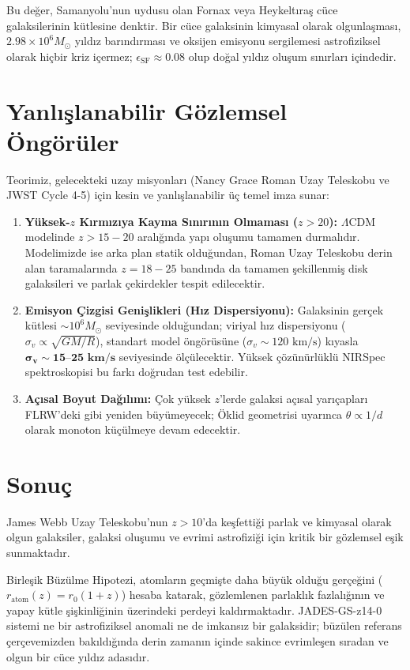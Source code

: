 \documentclass[11pt,a4paper]{article}
\begin{document}
Bu değer, Samanyolu'nun uydusu olan Fornax veya Heykeltıraş cüce galaksilerinin kütlesine denktir. Bir cüce galaksinin kimyasal olarak olgunlaşması, $2.98 \times 10^6 M_\odot$ yıldız barındırması ve oksijen emisyonu sergilemesi astrofiziksel olarak hiçbir kriz içermez; $\epsilon_{\mathrm{SF}} \approx 0.08$ olup doğal yıldız oluşum sınırları içindedir.

\section{Yanlışlanabilir Gözlemsel Öngörüler}
\label{sec:ongoruler}

Teorimiz, gelecekteki uzay misyonları (Nancy Grace Roman Uzay Teleskobu ve JWST Cycle 4-5) için kesin ve yanlışlanabilir üç temel imza sunar:

\begin{enumerate}
    \item \textbf{Yüksek-$z$ Kırmızıya Kayma Sınırının Olmaması ($z > 20$):} $\Lambda$CDM modelinde $z > 15-20$ aralığında yapı oluşumu tamamen durmalıdır. Modelimizde ise arka plan statik olduğundan, Roman Uzay Teleskobu derin alan taramalarında $z = 18 - 25$ bandında da tamamen şekillenmiş disk galaksileri ve parlak çekirdekler tespit edilecektir.
    \item \textbf{Emisyon Çizgisi Genişlikleri (Hız Dispersiyonu):} Galaksinin gerçek kütlesi $\sim 10^6 M_\odot$ seviyesinde olduğundan; viriyal hız dispersiyonu ($\sigma_v \propto \sqrt{GM/R}$), standart model öngörüsüne ($\sigma_v \sim 120\text{ km/s}$) kıyasla $\mathbf{\sigma_v \sim 15\text{--}25\text{ km/s}}$ seviyesinde ölçülecektir. Yüksek çözünürlüklü NIRSpec spektroskopisi bu farkı doğrudan test edebilir.
    \item \textbf{Açısal Boyut Dağılımı:} Çok yüksek $z$'lerde galaksi açısal yarıçapları FLRW'deki gibi yeniden büyümeyecek; Öklid geometrisi uyarınca $\theta \propto 1/d$ olarak monoton küçülmeye devam edecektir.
\end{enumerate}

\section{Sonuç}
\label{sec:sonuc}

James Webb Uzay Teleskobu'nun $z > 10$'da keşfettiği parlak ve kimyasal olarak olgun galaksiler, galaksi oluşumu ve evrimi astrofiziği için kritik bir gözlemsel eşik sunmaktadır.

Birleşik Büzülme Hipotezi, atomların geçmişte daha büyük olduğu gerçeğini ($r_{\mathrm{atom}}(z) = r_0(1+z)$) hesaba katarak, gözlemlenen parlaklık fazlalığının ve yapay kütle şişkinliğinin üzerindeki perdeyi kaldırmaktadır. JADES-GS-z14-0 sistemi ne bir astrofiziksel anomali ne de imkansız bir galaksidir; büzülen referans çerçevemizden bakıldığında derin zamanın içinde sakince evrimleşen sıradan ve olgun bir cüce yıldız adasıdır.
\end{document}
